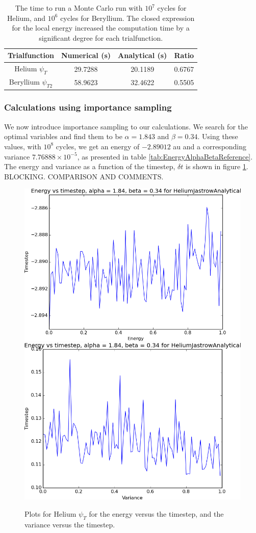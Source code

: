 			\begin{table}
				\center
				\begin{tabular}{| c | c | c | c |}
				    \hline
				   	\textbf{Trialfunction} & Numerical (s) & Analytical (s) & Ratio
				    \\ \hline
				    Helium $\psi_{T}$ & 29.7288 & 20.1189	& 0.6767
				    \\	\hline
				    Beryllium $\psi_{T2}$ & 58.9623  &	32.4622 & 0.5505
					    \\ \hline
				\end{tabular}
				\caption{The time to run a Monte Carlo run with \(10^7\) cycles for Helium, and \(10^6\) cycles for Beryllium. The closed expression for the local energy increased the computation time by a significant degree for each trialfunction. }
				\label{tab:analyticVSNumeric}
			\end{table}

		\subsubsection{Calculations using importance sampling}
			We now introduce importance sampling to our calculations. We search for the optimal variables and find them to be $\alpha=1.843$ and $\beta=0.34$. Using these values, with $10^{8}$ cycles, we get an energy of $-2.89012$ au and a corresponding variance $7.76888\times10^{-5}$, as presented in table \ref{tab:EnergyAlphaBetaReference}. The energy and variance as a function of the timestep, $\delta t$ is shown in figure \ref{fig:HeliumTimestep}. BLOCKING. COMPARISON AND COMMENTS. 

			\begin{figure}
				\centering \includegraphics[width=0.45\linewidth]{../figures/HeliumJastrowAnalyticalTimeEnergy}
				\includegraphics[width=0.45\linewidth]{../figures/HeliumJastrowAnalyticalTimeVariance}
				\protect\caption{Plots for Helium $\psi_{T}$ for the energy versus the timestep, and the variance versus the timestep.}
				\label{fig:HeliumTimestep}
			\end{figure}


